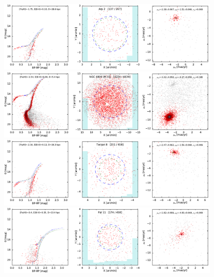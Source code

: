 \documentclass[usenatbib]{mnras}
\begin{document}
\clearpage\begin{figure}
\contcaption{}
\includegraphics{figs/Arp_2.pdf}
\includegraphics{figs/NGC_6809_M_55.pdf}
\includegraphics{figs/Terzan_8.pdf}
\includegraphics{figs/Pal_11.pdf}
\end{figure}
\end{document}
